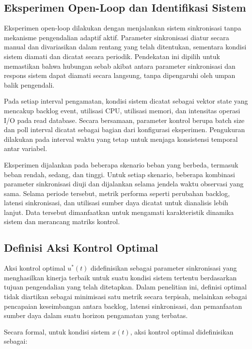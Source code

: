 \subsection{Eksperimen Open-Loop dan Identifikasi Sistem}

Eksperimen open-loop dilakukan dengan menjalankan sistem sinkronisasi tanpa mekanisme pengendalian adaptif aktif.
Parameter sinkronisasi diatur secara manual dan divariasikan dalam rentang yang telah ditentukan, sementara kondisi sistem diamati dan dicatat secara periodik.
Pendekatan ini dipilih untuk memastikan bahwa hubungan sebab akibat antara parameter sinkronisasi dan respons sistem dapat diamati secara langsung, tanpa dipengaruhi oleh umpan balik pengendali.

Pada setiap interval pengamatan, kondisi sistem dicatat sebagai vektor state yang mencakup backlog event, utilisasi CPU, utilisasi memori, dan intensitas operasi I/O pada read database.
Secara bersamaan, parameter kontrol berupa batch size dan poll interval dicatat sebagai bagian dari konfigurasi eksperimen.
Pengukuran dilakukan pada interval waktu yang tetap untuk menjaga konsistensi temporal antar variabel.

Eksperimen dijalankan pada beberapa skenario beban yang berbeda, termasuk beban rendah, sedang, dan tinggi.
Untuk setiap skenario, beberapa kombinasi parameter sinkronisasi diuji dan dijalankan selama jendela waktu observasi yang sama.
Selama periode tersebut, metrik performa seperti perubahan backlog, latensi sinkronisasi, dan utilisasi sumber daya dicatat untuk dianalisis lebih lanjut.
Data tersebut dimanfaatkan untuk mengamati karakteristik dinamika sistem dan merancang matriks kontrol.

\subsection{Definisi Aksi Kontrol Optimal}

Aksi kontrol optimal $u^*(t)$ didefinisikan sebagai parameter sinkronisasi yang menghasilkan kinerja terbaik untuk suatu kondisi sistem tertentu berdasarkan tujuan pengendalian yang telah ditetapkan.
Dalam penelitian ini, definisi optimal tidak diartikan sebagai minimisasi satu metrik secara terpisah, melainkan sebagai pencapaian keseimbangan antara backlog, latensi sinkronisasi, dan pemanfaatan sumber daya dalam suatu horizon pengamatan yang terbatas.

Secara formal, untuk kondisi sistem $x(t)$, aksi kontrol optimal didefinisikan sebagai:

